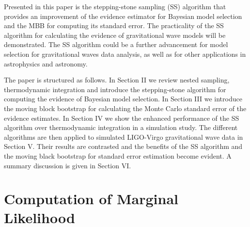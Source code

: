 \documentclass[aps,reprint,amsmath,amssymb,showpacs,showkeys]{revtex4-1}%
\newcommand{\cb}{ \color{blue}}
\begin{document}
Presented in this paper is the stepping-stone sampling (SS) algorithm that provides an improvement of the evidence estimator for Bayesian model selection and the MBB for computing its standard error. The practicality of the SS algorithm for calculating the evidence of gravitational wave models will be demonstrated. The SS algorithm could be a further advancement for model selection for gravitational waves data analysis, as well as for other applications in astrophysics and astronomy.%














The paper is structured as follows. In Section II we review nested sampling, thermodynamic integration and introduce the stepping-stone algorithm for computing the evidence of Bayesian model selection. In Section III we introduce the moving block bootstrap for calculating the Monte Carlo standard error of the evidence estimates. In Section IV we show the enhanced performance of the SS algorithm over thermodynamic integration in a simulation study. The different algorithms are then  applied  to simulated LIGO-Virgo gravitational wave data in Section V. Their results are contrasted and  the benefits of the SS  algorithm and the moving black bootstrap for standard error estimation become evident. A summary discussion is given in Section VI.



\section{Computation of Marginal Likelihood}
\end{document}
